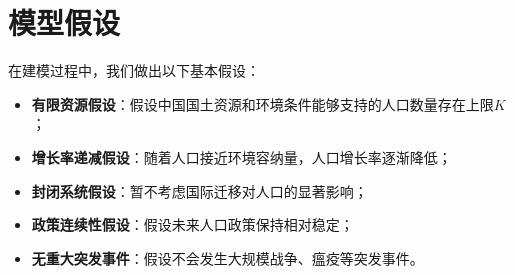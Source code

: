 \section{模型假设}\label{sec:Premise}

在建模过程中，我们做出以下基本假设：

    

    

    


\begin{itemize}
\item \textbf{有限资源假设}：假设中国国土资源和环境条件能够支持的人口数量存在上限$K$；
\item \textbf{增长率递减假设}：随着人口接近环境容纳量，人口增长率逐渐降低；
\item \textbf{封闭系统假设}：暂不考虑国际迁移对人口的显著影响；
\item \textbf{政策连续性假设}：假设未来人口政策保持相对稳定；
\item \textbf{无重大突发事件}：假设不会发生大规模战争、瘟疫等突发事件。
\end{itemize}